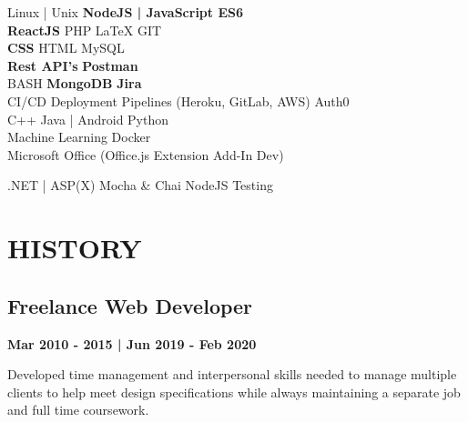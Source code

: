 \documentclass[letterpaper]{deedy-resume} %
\begin{document}
\begin{minipage}[t]{0.33\textwidth}

Linux | Unix \textbullet{} \textbf{NodeJS | JavaScript ES6}  \\
\textbf{ReactJS} \textbullet{} PHP \textbullet{} LaTeX \textbullet{} GIT \\
\textbf{CSS} \textbullet{} HTML \textbullet{} MySQL \\
\textbf{Rest API's} \textbullet{} \textbf{Postman} \textbullet{} \\
BASH \textbullet{} \textbf{MongoDB} \textbullet{} \textbf{Jira} \\
CI/CD Deployment Pipelines (Heroku, GitLab, AWS) \textbullet{} Auth0 \\


C++ \textbullet{} Java | Android \textbullet{} Python \\
Machine Learning \textbullet{} Docker \textbullet{} \\
\textbullet{} Microsoft Office (Office.js Extension Add-In Dev) \\

\vspace{\topsep} %

.NET | ASP(X) \textbullet{} Mocha \& Chai NodeJS Testing \\ 


\sectionspace %
\section{HISTORY}
\subsection{Freelance Web Developer}
{\bf Mar 2010 - 2015 | Jun 2019 - Feb 2020}

\textbullet{} Developed time management and interpersonal skills needed to manage multiple clients to help meet design specifications while always maintaining a separate job and full time coursework.  

\end{minipage} %
\end{document}
